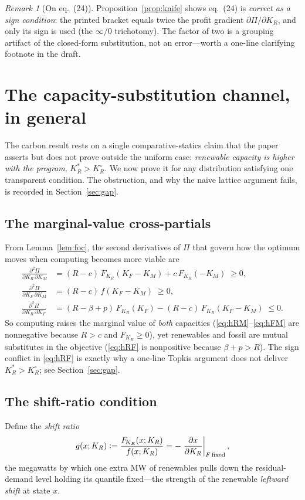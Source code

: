 \documentclass[11pt,reqno]{amsart}
\theoremstyle{plain}
\theoremstyle{definition}
\theoremstyle{remark}
\newtheorem{remark}{Remark}
\newcommand{\KR}{K_R}
\newcommand{\KF}{K_F}
\newcommand{\KM}{K_M}
\newcommand{\KRs}{K_R^{*}}
\newcommand{\KRo}{K_R^{\circ}}
\newcommand{\bp}{\beta+p}
\newcommand{\FKR}{F_{\!\KR}}
\newcommand{\eqdef}{\vcentcolon=}
\begin{document}
\begin{remark}[On eq.\ (24)]
Proposition~\ref{prop:knife} shows eq.\ (24) is \emph{correct as a sign
condition}: the printed bracket equals twice the profit gradient
$\partial\Pi/\partial\KR$, and only its sign is used (the $\infty/0$
trichotomy). The factor of two is a grouping artifact of the closed-form
substitution, not an error---worth a one-line clarifying footnote in the draft.
\end{remark}

\section{The capacity-substitution channel, in general}\label{sec:capacity}

The carbon result rests on a single comparative-statics claim that the paper
asserts but does not prove outside the uniform case: \emph{renewable capacity is
higher with the program}, $\KRs>\KRo$. We now prove it for any distribution
satisfying one transparent condition. The obstruction, and why the naive
lattice argument fails, is recorded in Section~\ref{sec:gap}.

\subsection{The marginal-value cross-partials}
From Lemma~\ref{lem:foc}, the second derivatives of $\Pi$ that govern how the
optimum moves when computing becomes more viable are
\begin{align}
  \frac{\partial^2\Pi}{\partial\KR\,\partial\KM}
    &=(R-c)\,\FKR(\KF-\KM)+c\,\FKR(-\KM)\;\ge 0,\label{eq:hRM}\\
  \frac{\partial^2\Pi}{\partial\KF\,\partial\KM}
    &=(R-c)\,f(\KF-\KM)\;\ge 0,\label{eq:hFM}\\
  \frac{\partial^2\Pi}{\partial\KR\,\partial\KF}
    &=(R-\bp)\,\FKR(\KF)-(R-c)\,\FKR(\KF-\KM)\;\le 0.\label{eq:hRF}
\end{align}
So computing raises the marginal value of \emph{both} capacities
(\eqref{eq:hRM}--\eqref{eq:hFM} are nonnegative because $R>c$ and $\FKR\ge0$),
yet renewables and fossil are mutual substitutes in the objective
(\eqref{eq:hRF} is nonpositive because $\bp>R$). The sign conflict in
\eqref{eq:hRF} is exactly why a one-line Topkis argument does not deliver
$\KRs>\KRo$; see Section~\ref{sec:gap}.

\subsection{The shift-ratio condition}
Define the \emph{shift ratio}
\begin{equation}\label{eq:shift}
  g(x;\KR)\eqdef\frac{\FKR(x;\KR)}{f(x;\KR)}
  =-\left.\frac{\partial x}{\partial\KR}\right|_{F\,\text{fixed}} ,
\end{equation}
the megawatts by which one extra MW of renewables pulls down the residual-demand
level holding its quantile fixed---the strength of the renewable
\emph{leftward shift} at state $x$.
\end{document}
